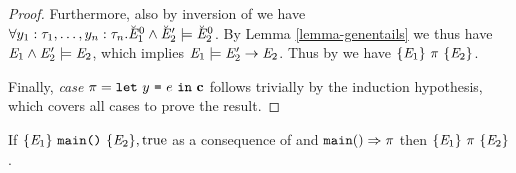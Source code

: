 \begin{proof}
  Furthermore, also by inversion of  we have
  $\forall y_1:\tau_1,\ldots,y_n:\tau_n . \breve{\mathit{E}}^0_1 \wedge 
  \breve{\mathit{E}}_2' \models \breve{\mathit{E}}^0_2$. 
  By Lemma \ref{lemma-genentails} we thus have $\mathit{E}_1
  \wedge \mathit{E}_2' \models \mathit{E}_2$, which implies
  $\mathit{E}_1 \models \mathit{E}_2' \rightarrow \mathit{E}_2$.
  Thus by  we have $\{ \mathit{E}_1 \}\ \pi\ \{ \mathit{E}_2 \}$.

  Finally, \textit{case} $\pi = \texttt{let}\ y\ \texttt{=}\ e\ \texttt{in}\ \mathbf{c}$ follows trivially
  by the induction hypothesis, which covers all cases to prove
  the result.
\end{proof}

\begin{theorem}
  If $\{ \mathit{E}_1 \}\ \texttt{main()}\ \{ \mathit{E}_2 \},\mathrm{true}$ as a consequence of
   and $\texttt{main}() \Rightarrow \pi$ then
  $\{ \mathit{E}_1 \}\ \pi\ \{ \mathit{E}_2 \}$.
\end{theorem}
